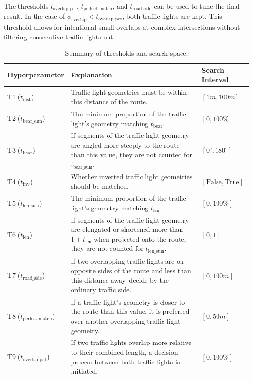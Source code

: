 The thresholds $t_{\text{overlap\_pct}}$, $t_{\text{perfect\_match}}$, and $t_{\text{road\_side}}$ can be used to tune the final result. In the case of $\phi_{\text{overlap}} < t_{\text{overlap\_pct}}$, both traffic lights are kept. This threshold allows for intentional small overlaps at complex intersections without filtering consecutive traffic lights out.

\begin{table}[!b]
\caption{Summary of thresholds and search space.}
\begin{tabular}{@{}lp{8cm}l@{}}
\toprule
\textbf{Hyperparameter}  & \textbf{Explanation} & \textbf{Search Interval} \\
\midrule
T1 ($t_{\text{dist}}$) & Traffic light geometries must be within this distance of the route. & $[1m, 100m]$ \\
T2 ($t_{\text{bear\_sum}}$) & The minimum proportion of the traffic light's geometry matching $t_{\text{bear}}$. & $[0, 100\%]$ \\
T3 ($t_{\text{bear}}$) & If segments of the traffic light geometry are angled more steeply to the route than this value, they are not counted for $t_{\text{bear\_sum}}$. & $[0^{\circ}, 180^{\circ}]$ \\
T4 ($t_{\text{inv}}$) & Whether inverted traffic light geometries should be matched. & $[\text{False}, \text{True}]$ \\
T5 ($t_{\text{len\_sum}}$) & The minimum proportion of the traffic light's geometry matching $t_{\text{len}}$. & $[0, 100\%]$ \\
T6 ($t_{\text{len}}$) & If segments of the traffic light geometry are elongated or shortened more than $1 \pm t_{\text{len}}$ when projected onto the route, they are not counted for $t_{\text{len\_sum}}$. & $[0, 1]$\\
T7 ($t_{\text{road\_side}}$) & If two overlapping traffic lights are on opposite sides of the route and less than this distance away, decide by the ordinary traffic side. & $[0, 100m]$ \\
T8 ($t_{\text{perfect\_match}}$) & If a traffic light's geometry is closer to the route than this value, it is preferred over another overlapping traffic light geometry. & $[0, 50m]$ \\
T9 ($t_{\text{overlap\_pct}}$) & If two traffic lights overlap more relative to their combined length, a decision process between both traffic lights is initiated. & $[0, 100\%]$ \\
\bottomrule
\end{tabular}
\label{tab:hyperparameter-space}
\end{table}

